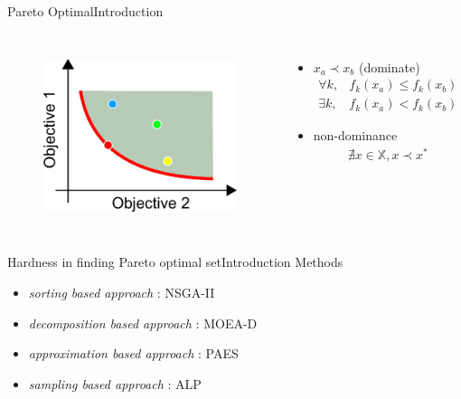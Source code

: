 \begin{frame}{Pareto Optimal}{Introduction}
\begin{columns}
	\begin{figure}
		\centering
		\includegraphics[width=\linewidth]{figure/pareto_optimal}
		\label{fig:pareot_optimal}
	\end{figure}
\begin{minipage}{\textwidth}
\begin{itemize}
\item $ x_{a} \prec x_{b} $ (dominate)
\begin{eqnarray*}
\forall k, & f_{k} (x_{a}) \leq f_{k} (x_{b}) \\
\exists k, & f_{k} (x_{a}) < f_{k} (x_{b})
\end{eqnarray*}
\item non-dominance
\begin{eqnarray*}
\nexists x \in \mathbb{X}, x \prec x^{*}
\end{eqnarray*}
\end{itemize}
\end{minipage}
\end{columns}
\end{frame}

\begin{frame}{Hardness in finding Pareto optimal set}{Introduction}
Methods
\begin{itemize}
\item \emph{sorting based approach} : NSGA-II
\item \emph{decomposition based approach} : MOEA-D
\item \emph{approximation based approach} : PAES
\item \emph{sampling based approach} : ALP
\end{itemize}
\end{frame}

